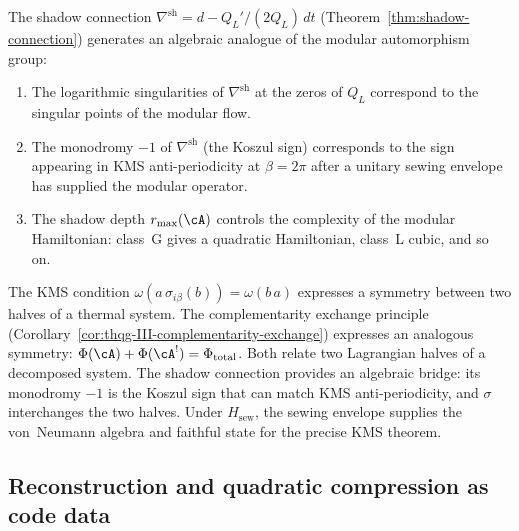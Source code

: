 \begin{conjecture}
\ClaimStatusConjectured
\label{conj:thqg-modular-flow}
The shadow connection
$\nabla^{\mathrm{sh}} = d - Q_L'/(2Q_L)\, dt$
(Theorem~\ref{thm:shadow-connection})
generates an algebraic analogue of the modular automorphism group:
\begin{enumerate}[label=\textup{(\roman*)}]
\item The logarithmic singularities of $\nabla^{\mathrm{sh}}$
 at the zeros of $Q_L$ correspond to the singular points of
 the modular flow.
\item The monodromy $-1$ of $\nabla^{\mathrm{sh}}$
 (the Koszul sign) corresponds to the
 sign appearing in KMS anti-periodicity at $\beta = 2\pi$ after a
 unitary sewing envelope has supplied the modular operator.
\item The shadow depth $r_{\max}(\cA)$ controls the complexity
 of the modular Hamiltonian: class~G gives a quadratic
 Hamiltonian, class~L cubic, and so on.
\end{enumerate}
\end{conjecture}

\begin{remark}
\label{rem:thqg-kms-from-complementarity}
The KMS condition
$\omega(a\, \sigma_{i\beta}(b)) = \omega(b\, a)$
expresses a symmetry between two halves of a thermal system.
The complementarity exchange principle
(Corollary~\ref{cor:thqg-III-complementarity-exchange})
expresses an analogous symmetry:
$\Phi(\cA) + \Phi(\cA^!) = \Phi_{\mathrm{total}}$.
Both relate two Lagrangian halves of a decomposed system.
The shadow connection provides an algebraic bridge: its monodromy
$-1$ is the Koszul sign that can match KMS anti-periodicity, and
$\sigma$ interchanges the two halves.  Under $H_{\mathrm{sew}}$, the
sewing envelope supplies the von~Neumann algebra and faithful state
for the precise KMS theorem.
\end{remark}

%
%

\subsection{Reconstruction and quadratic compression as code data}
\label{subsec:thqg-entanglement-error-correction}

